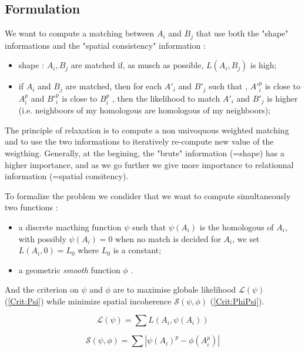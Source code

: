 \subsection{Formulation}

We want to compute a matching between $A_i$ and $B_j$ that use both the "shape" informations 
and the "spatial consistency" information :

\begin{itemize}
   \item shape : $A_i , B_j$  are matched if, as musch as possible, $L(A_i,B_j)$ is high;
   \item if $A_i$ and $B_j$ are matched, then for each $A'_i$ and $B'_j$ such that ,
         $A'^p_i$ is close to $A^p_i$ and $B'^p_i$ is close to $B^p_i$ , then the likelihood
         to match $A'_i$ and $B'_j$ is higher (i.e. neighboors of my homologous are homologous of
         my neighboors);
\end{itemize}

The principle of relaxation is to compute a non univoquous weighted matching and to use
the two informations to iteratively re-compute new value of the weigthing. Generally, at
the begining, the "brute" information (=shape) has a higher importance, and as we go
further we give more importance to relationnal information (=spatial consitency).

To formalize the problem we condider that we want to compute simultaneously two functions :


\begin{itemize}
   \item a discrete macthing function $\psi$  such that $\psi (A_i)$ is the homologous
         of $A_i$, with possibly $\psi (A_i) = 0$  when no match is decided for $A_i$,
         we set  $L(A_i,0) = L_0$ where $L_0$ is a constant;
   \item a geometric \emph{smooth} function $\phi$ .
\end{itemize}

And the criterion on $\psi$ and $\phi$ are to  maximise globale
likelihood $\mathcal L(\psi)$ (\ref{Crit:Psi})  while minimize
spatial incoherence $ \mathcal S(\psi,\phi)$  (\ref{Crit:PhiPsi}).


\begin{equation}
    \mathcal L(\psi) = \sum  L(A_i,\psi(A_i)) \label{Crit:Psi}
\end{equation}


\begin{equation}
    \mathcal S(\psi,\phi) = \sum  | \psi(A_i)^p - \phi(A^p_i) | \label{Crit:PhiPsi}
\end{equation}

